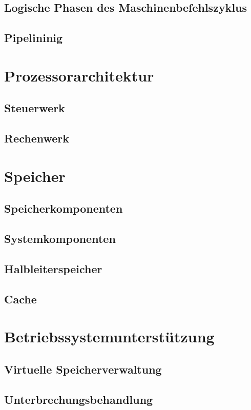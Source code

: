 \documentclass[a4paper]{scrartcl}
\begin{document}
		\subsection{Logische Phasen des Maschinenbefehlszyklus}
		\subsection{Pipelininig}
		
	\section{Prozessorarchitektur}
		\subsection{Steuerwerk}
		\subsection{Rechenwerk}
		
	\section{Speicher}
		\subsection{Speicherkomponenten}
		\subsection{Systemkomponenten}
		\subsection{Halbleiterspeicher}
		\subsection{Cache}
		
	\section{Betriebssystemunterstützung}
		\subsection{Virtuelle Speicherverwaltung}
		\subsection{Unterbrechungsbehandlung}
		
\end{document}
